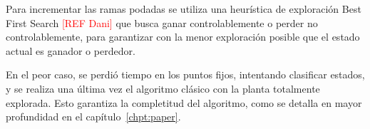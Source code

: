 Para incrementar las ramas podadas se utiliza una heurística de exploración Best First Search \textcolor{red}{[REF Dani]} que busca ganar controlablemente o perder no controlablemente, para garantizar con la menor exploración posible que el estado actual es ganador o perdedor.

En el peor caso, se perdió tiempo en los puntos fijos, intentando clasificar estados, y se realiza una última vez el algoritmo clásico con la planta totalmente explorada. Esto garantiza la completitud del algoritmo, como se detalla en mayor profundidad en el capítulo~\ref{chpt:paper}.
















